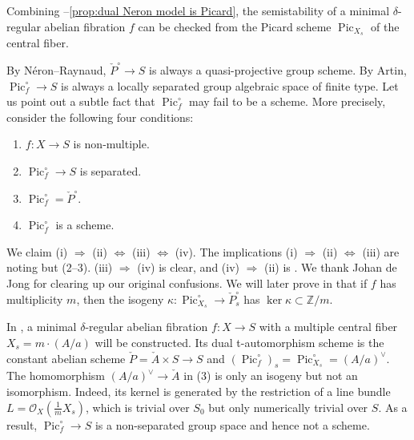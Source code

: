 \documentclass[reqno, letterpaper]{amsart}
\numberwithin{equation}{subsection}
\let\to\longrightarrow
\newcommand{\ZZ}{\mathbb{Z}}
\DeclareMathOperator{\Pic}{Pic}
\begin{document}
		Combining --\ref{prop:dual Neron model is Picard}, the semistability of a minimal $\delta$-regular abelian fibration $f$ can be checked from the Picard scheme $\Pic_{X_s}$ of the central fiber.
		
		\begin{remark} \label{rmk:dual Neron model is Picard}
			By N\'eron--Raynaud, $\check P^\circ \to S$ is always a quasi-projective group scheme. By Artin, $\Pic^\circ_f \to S$ is always a locally separated group algebraic space of finite type. Let us point out a subtle fact that $\Pic^\circ_f$ may fail to be a scheme. More precisely, consider the following four conditions:
			\begin{enumerate}[label = \textnormal{(\roman*)}]
				\item $f : X \to S$ is non-multiple.
				\item $\Pic^\circ_f \to S$ is separated.
				\item $\Pic^\circ_f = \check P^\circ$.
				\item $\Pic^\circ_f$ is a scheme.
			\end{enumerate}
			We claim (i) $\Longrightarrow$ (ii) $\Longleftrightarrow$ (iii) $\Longleftrightarrow$ (iv). The implications (i) $\Longrightarrow$ (ii) $\Longleftrightarrow$ (iii) are noting but (2--3). (iii) $\Longrightarrow$ (iv) is clear, and (iv) $\Longrightarrow$ (ii) is \cite[$\mathrm{VI_B}$~Corollary~5.5]{SGA3I}. We thank Johan de Jong for clearing up our original confusions. We will later prove in  that if $f$ has multiplicity $m$, then the isogeny $\kappa : \Pic^\circ_{X_s} \to \check P^\circ_s$ has $\ker \kappa \subset \ZZ/m$.
		\end{remark}
		
		\begin{example} \label{ex:non-separated Pic}
			In , a minimal $\delta$-regular abelian fibration $f : X \to S$ with a multiple central fiber $X_s = m \cdot (A/a)$ will be constructed. Its dual t-automorphism scheme is the constant abelian scheme $\check P = \check A \times S \to S$ and $(\Pic^\circ_f)_s = \Pic^\circ_{X_s} = (A/a)^\vee$. The homomorphism $(A/a)^\vee \to \check A$ in (3) is only an isogeny but not an isomorphism. Indeed, its kernel is generated by the restriction of a line bundle $L = \mathcal O_X(\frac{1}{m} X_s)$, which is trivial over $S_0$ but only numerically trivial over $S$. As a result, $\Pic^\circ_f \to S$ is a non-separated group space and hence not a scheme.
		\end{example}
		
\end{document}
